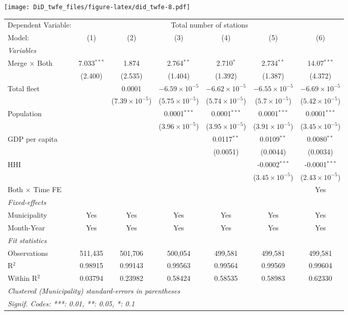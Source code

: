 \documentclass[
]{article}
\begin{document}
\texttt{[image: DiD\_twfe\_files/figure-latex/did\_twfe-8.pdf]}

\begin{tabular}{lcccccc}
\tabularnewline\midrule\midrule
Dependent Variable:&\multicolumn{6}{c}{Total number of stations}\\
Model:&(1) & (2) & (3) & (4) & (5) & (6)\\
\midrule \emph{Variables}&   &   &   &   &   &  \\
Merge $\times $ Both & 7.033$^{***}$ & 1.874 & 2.764$^{**}$ & 2.710$^{*}$ & 2.734$^{**}$ & 14.07$^{***}$\\
  &(2.400) & (2.535) & (1.404) & (1.392) & (1.387) & (4.372)\\
Total fleet &    & 0.0001 & $-6.59\times 10^{-5}$ & $-6.62\times 10^{-5}$ & $-6.55\times 10^{-5}$ & $-6.69\times 10^{-5}$\\
  &   & ($7.39\times 10^{-5}$) & ($5.75\times 10^{-5}$) & ($5.74\times 10^{-5}$) & ($5.7\times 10^{-5}$) & ($5.42\times 10^{-5}$)\\
Population &    &    & 0.0001$^{***}$ & 0.0001$^{***}$ & 0.0001$^{***}$ & 0.0001$^{***}$\\
  &   &    & ($3.96\times 10^{-5}$) & ($3.95\times 10^{-5}$) & ($3.91\times 10^{-5}$) & ($3.45\times 10^{-5}$)\\
GDP per capita &    &    &    & 0.0117$^{**}$ & 0.0109$^{**}$ & 0.0080$^{**}$\\
  &   &    &    & (0.0051) & (0.0044) & (0.0034)\\
HHI &    &    &    &    & -0.0002$^{***}$ & -0.0001$^{***}$\\
  &   &    &    &    & ($3.45\times 10^{-5}$) & ($2.43\times 10^{-5}$)\\
Both $\times$ Time FE &  &  &  &  &  & Yes\\
\midrule \emph{Fixed-effects}&   &   &   &   &   &  \\
Municipality & Yes & Yes & Yes & Yes & Yes & Yes\\
Month-Year & Yes & Yes & Yes & Yes & Yes & Yes\\
\midrule \emph{Fit statistics}&  & & & & & \\
Observations & 511,435&501,706&500,054&499,581&499,581&499,581\\
R$^2$ & 0.98915&0.99143&0.99563&0.99564&0.99569&0.99604\\
Within R$^2$ & 0.03794&0.23982&0.58424&0.58535&0.58983&0.62330\\
\midrule\midrule\multicolumn{7}{l}{\emph{Clustered (Municipality) standard-errors in parentheses}}\\
\multicolumn{7}{l}{\emph{Signif. Codes: ***: 0.01, **: 0.05, *: 0.1}}\\
\end{tabular}
\end{document}
